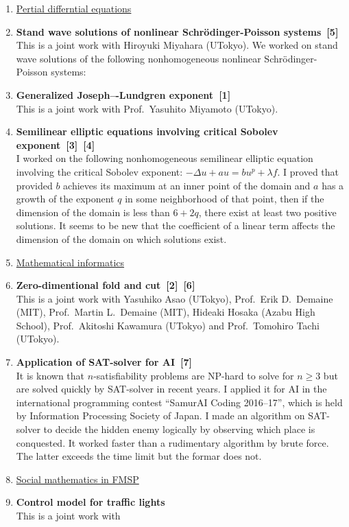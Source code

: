 \documentclass[a4j,twocolumn]{jarticle}
\begin{document}

\begin{enumerate}
 \item[] \underline{Pertial differntial equations}
 \item {\bf Stand wave solutions of
       nonlinear Schr\"{o}dinger-Poisson systems~[5]} \\
       This is a joint work with Hiroyuki Miyahara (UTokyo).
       We worked on stand wave solutions
       of the following nonhomogeneous
       nonlinear Schr\"{o}dinger-Poisson systems:

 \item {\bf Generalized Joseph–-Lundgren exponent~[1]} \\
       This is a joint work with Prof.~Yasuhito Miyamoto (UTokyo).
       

 \item {\bf Semilinear elliptic equations involving
       critical Sobolev exponent~[3]~[4]} \\
       I worked on the following
       nonhomogeneous semilinear elliptic equation
       involving the critical Sobolev exponent:
       $-\Delta u + a u = b u^p + \lambda f$.
       I proved that provided 
       $b$ achieves its maximum at an inner point of the
       domain and $a$ has a growth of the exponent $q$
       in some neighborhood of that point, then
       if the dimension of the domain is less than $6 + 2q$,
       there exist at least two positive solutions.
       It seems to be new that the coefficient of a linear term affects
       the dimension of the domain on which solutions exist.
 \item[] \underline{Mathematical informatics}
 \item {\bf Zero-dimentional fold and cut~[2]~[6]} \\
       This is a joint work with
       Yasuhiko Asao (UTokyo), Prof.~Erik D.~Demaine (MIT),
       Prof.~Martin L.~Demaine (MIT), Hideaki Hosaka (Azabu High School),
       Prof.~Akitoshi Kawamura (UTokyo)
       and Prof.~Tomohiro Tachi (UTokyo).
 \item {\bf Application of SAT-solver for AI~[7]} \\
       It is known that $n$-satisfiability problems are NP-hard
       to solve for $n \geq 3$
       but are solved quickly by SAT-solver in recent years.
       I applied it for AI in the international
       programming contest ``SamurAI Coding
       2016--17'', which is held by Information
       Processing Society of Japan. I made an algorithm on SAT-solver
       to decide the hidden enemy logically
       by observing which place is conquested.
       It worked faster than a rudimentary algorithm by brute force.
       The latter exceeds the time limit but
       the formar does not.
 \item[] \underline{Social mathematics in FMSP}
 \item {\bf Control model for traffic lights} \\
       This is a joint work with
\end{enumerate}
\end{document}

